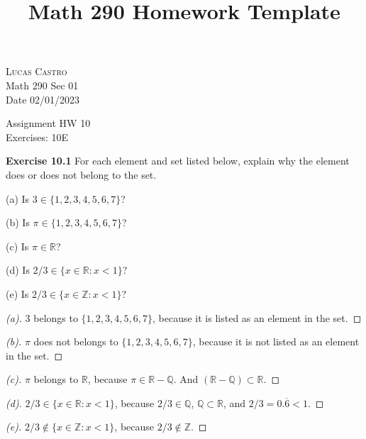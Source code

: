 \documentclass[12pt,oneside]{article}
\newenvironment{exercise}[1]{\vspace{.1in}\noindent\textbf{Exercise #1 \hspace{.05em}}}{}
\newcommand{\R}{\mathbb{R}}
\newcommand{\Z}{\mathbb{Z}}
\newcommand{\Q}{\mathbb{Q}}
\begin{document}
\title{Math 290 Homework Template}

\begin{flushright}
\textsc{Lucas Castro}  \\
Math 290 Sec 01\\
Date 02/01/2023
\end{flushright}

\begin{center}
\textsf{Assignment HW 10} \\
\textsf{Exercises: 10E}
\end{center}


\begin{exercise}{10.1}
For each element and set listed below, explain why the element does or does not belong to the set.

(a) Is $3 \in \{1,2,3,4,5,6,7\}$?

(b) Is $\pi \in \{1,2,3,4,5,6,7\}$?

(c) Is $\pi \in \R$?

(d) Is $2/3 \in \{x \in \R: x < 1\}$?

(e) Is $2/3 \in \{x \in \Z: x < 1\}$?
\end{exercise}

\begin{proof}[(a)]
$3$ belongs to $\{1,2,3,4,5,6,7\}$, because it is listed as an element in the set.
\end{proof}

\begin{proof}[(b)]
$\pi$ does not belongs to $\{1,2,3,4,5,6,7\}$, because it is not listed as an element in the set.
\end{proof}

\begin{proof}[(c)]
$\pi$ belongs to $\R$, because $\pi \in \R - \Q$. And $(\R - \Q) \subset \R$. 
\end{proof}

\begin{proof}[(d)]
$2/3 \in \{x \in \R: x < 1\}$, because $2/3 \in \Q$, $\Q \subset \R$, and $2/3 = 0.\overline{6} < 1$. 
\end{proof}

\begin{proof}[(e)]
$2/3 \notin \{x \in \Z: x < 1\}$, because $2/3 \notin \Z$. 
\end{proof}
\end{document}
